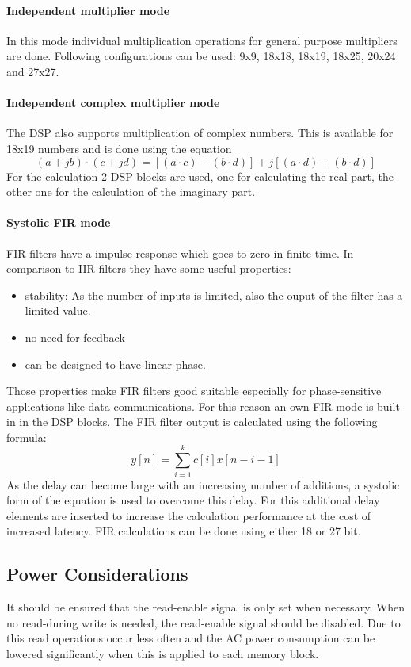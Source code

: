 \paragraph{Independent multiplier mode}
In this mode individual multiplication operations for general purpose multipliers are done. Following configurations can be used: 9x9, 18x18, 18x19, 18x25, 20x24 and 27x27.
\paragraph{Independent complex multiplier mode}
The DSP also supports multiplication of complex numbers. This is available for 18x19 numbers and is done using the equation
\begin{equation}
(a+jb)\cdot (c+jd)=[(a\cdot c)-(b\cdot d)]+j[(a\cdot d)+(b\cdot d)]
\end{equation}
For the calculation 2 DSP blocks are used, one for calculating the real part, the other one for the calculation of the imaginary part.
\paragraph{Systolic FIR mode}
FIR filters have a impulse response which goes to zero in finite time. In comparison to IIR filters they have some useful properties:
\begin{itemize}
\item stability: As the number of inputs is limited, also the ouput of the filter has a limited value.
\item no need for feedback
\item can be designed to have linear phase.
\end{itemize}
Those properties make FIR filters good suitable especially for phase-sensitive applications like data communications. For this reason an own FIR mode is built-in in the DSP blocks. The FIR filter output is calculated using the following formula:
\begin{equation}
y[n]=\sum_{i=1}^{k}c[i]x[n-i-1]
\end{equation}
As the delay can become large with an increasing number of additions, a systolic form of the equation is used to overcome this delay. For this additional delay elements are inserted to increase the calculation performance at the cost of increased latency. FIR calculations can be done using either 18 or 27 bit.
\subsection{Power Considerations}
It should be ensured that the read-enable signal is only set when necessary. When no read-during write is needed, the read-enable signal should be disabled. Due to this read operations occur less often and the AC power consumption can be lowered significantly when this is applied to each memory block.\cite[chapter 1]{AlteraFPGA15}
